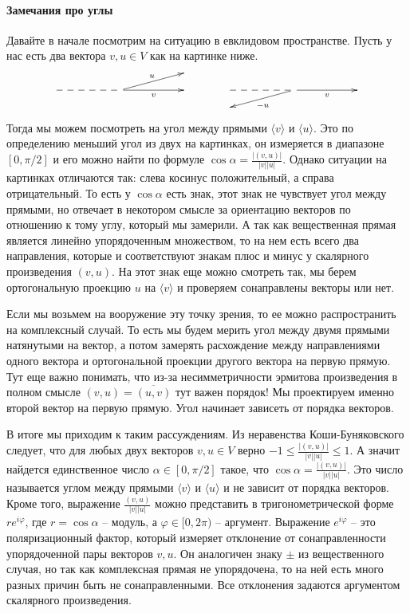 \paragraph{Замечания про углы}
Давайте в начале посмотрим на ситуацию в евклидовом пространстве. Пусть у нас есть два вектора $v, u\in V$ как на картинке ниже.
\[
\xymatrix@R=10pt{
	{}&{}&{}&{}&{}\\
	{}&{}&{}\ar[rr]_v\ar@{--}[ll]\ar[rru]^u&{}&{}\\
	{}&{}&{}&{}&{}\\
}
\quad
\quad
\quad
\xymatrix@R=10pt{
	{}&{}&{}&{}&{}\\
	{}&{}&{}\ar[rr]_v\ar@{--}[ll]\ar[lld]^{-u}&{}&{}\\
	{}&{}&{}&{}&{}\\
}
\]
Тогда мы можем посмотреть на угол между прямыми $\langle v\rangle$ и $\langle u\rangle$. Это по определению меньший угол из двух на картинках, он измеряется в диапазоне $[0, \pi / 2]$ и его можно найти по формуле $\cos\alpha = \frac{|(v, u)|}{|v| |u|}$. Однако ситуации на картинках отличаются так: слева косинус положительный, а справа отрицательный. То есть у $\cos\alpha$ есть знак, этот знак не чувствует угол между прямыми, но отвечает в некотором смысле за ориентацию векторов по отношению к тому углу, который мы замерили. А так как вещественная прямая является линейно упорядоченным множеством, то на нем есть всего два направления, которые и соответствуют знакам плюс и минус у скалярного произведения $(v, u)$. На этот знак еще можно смотреть так, мы берем ортогональную проекцию $u$ на $\langle v\rangle$ и проверяем сонаправлены векторы или нет.

Если мы возьмем на вооружение эту точку зрения, то ее можно распространить на комплексный случай. То есть мы будем мерить угол между двумя прямыми натянутыми на вектор, а потом замерять расхождение между направлениями одного вектора и ортогональной проекции другого вектора на первую прямую. Тут еще важно понимать, что из-за несимметричности эрмитова произведения в полном смысле $(v, u) = \overline{(u, v)}$ тут важен порядок! Мы проектируем именно второй вектор на первую прямую. Угол начинает зависеть от порядка векторов.

В итоге мы приходим к таким рассуждениям. Из неравенства Коши-Буняковского следует, что для любых двух векторов $v,u\in V$ верно $-1\leqslant \frac{|(v,u)|}{|v| |u|}\leqslant 1$. А значит найдется единственное число $\alpha\in [0,\pi/2]$ такое, что $\cos \alpha = \frac{|(v,u)|}{|v| |u|}$. Это число называется углом между прямыми $\langle v\rangle$ и $\langle u \rangle$ и не зависит от порядка векторов. Кроме того, выражение $\frac{(v, u)}{|v| |u|}$ можно представить в тригонометрической форме $r e^{i\varphi}$, где $r = \cos \alpha$ -- модуль, а $\varphi \in [0,2\pi)$ -- аргумент. Выражение $e^{i\varphi}$ -- это поляризационный фактор, который измеряет отклонение от сонаправленности упорядоченной пары векторов $v, u$. Он аналогичен знаку $\pm$ из вещественного случая, но так как комплексная прямая не упорядочена, то на ней есть много разных причин быть не сонаправленными. Все отклонения задаются аргументом скалярного произведения.

